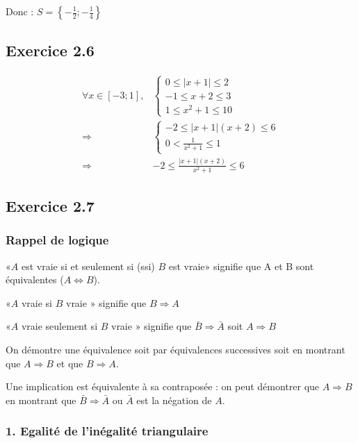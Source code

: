 \documentclass[a4paper,10pt]{report}
\begin{document}
Donc : $S=\left\lbrace -\frac{1}{2} ; -\frac{1}{4} \right\rbrace$

\subsection*{Exercice 2.6}

\begin{equation*}
	\begin{split}
		\forall x \in [-3 ; 1],
		& \begin{cases}
			0 \leq |x+1| \leq 2 \\
		    -1 \leq x+2 \leq 3 \\
		    1 \leq x^2 + 1 \leq 10
		\end{cases} \\
		\Longrightarrow 
		& \begin{cases}
			-2 \leq |x+1|(x+2) \leq 6 \\
			0 < \frac{1}{x^2 + 1} \leq 1
		\end{cases} \\
		\Longrightarrow 
		& -2 \leq \frac{|x+1|(x+2)}{x^2 + 1} \leq 6 
	\end{split}
\end{equation*}

\subsection*{Exercice 2.7}

\subsubsection*{Rappel de logique}

«$A$ est vraie si et seulement si (ssi) $B$ est vraie» signifie que A et B sont équivalentes ($A\Longleftrightarrow B$).

«$A$ vraie si $B$ vraie » signifie que $B \Rightarrow A$

«$A$ vraie seulement si $B$ vraie » signifie que  $\bar{B} \Rightarrow \bar{A}$ soit $A \Rightarrow B$

On démontre une équivalence soit par équivalences successives soit en montrant que $A\Rightarrow B$ et que 
$B\Rightarrow A$.

Une implication est équivalente à sa contraposée : on peut démontrer que $A\Rightarrow B$ en montrant que
$\bar{B}\Rightarrow \bar{A}$ ou $\bar{A}$ est la négation de $A$.

\subsubsection*{1. Egalité de l'inégalité triangulaire}
\end{document}
